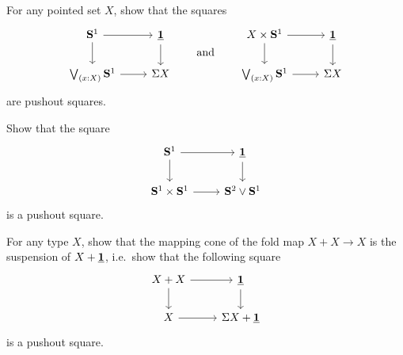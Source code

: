 \begin{exercises}
\item For any pointed set $X$, show that the squares
  \begin{equation*}
    \begin{tikzcd}
      \sphere{1} \arrow[r] \arrow[d] & \unit \arrow[d] \\
      \bigvee_{(x:X)}\sphere{1} \arrow[r] & \susp{X}
    \end{tikzcd}
    \qquad\text{and}\qquad
    \begin{tikzcd}
      X\times \sphere{1} \arrow[d] \arrow[r] & \unit \arrow[d] \\
      \bigvee_{(x:X)}\sphere{1} \arrow[r] & \susp{X}
    \end{tikzcd}
  \end{equation*}
  are pushout squares.
\item Show that the square
  \begin{equation*}
    \begin{tikzcd}
      \sphere{1} \arrow[r] \arrow[d] & \unit \arrow[d] \\
      \sphere{1}\times\sphere{1} \arrow[r] & \sphere{2}\vee\sphere{1}
    \end{tikzcd}
  \end{equation*}
  is a pushout square.
\item For any type $X$, show that the mapping cone of the fold map $X+X\to X$ is the suspension of $X+\underline{\mathbf{1}}$, i.e.~show that the following square
  \begin{equation*}
    \begin{tikzcd}
      X+X \arrow[d] \arrow[r] & \unit \arrow[d] \\
      X \arrow[r] & \susp{X+\unit}
    \end{tikzcd}
  \end{equation*}
  is a pushout square.
\end{exercises}
